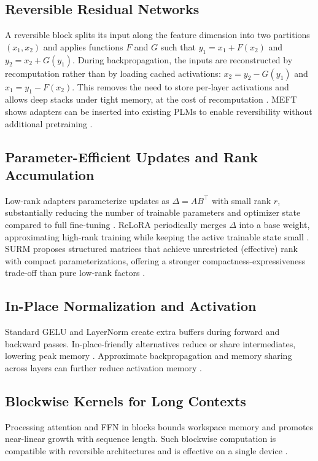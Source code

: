 \documentclass{article}
\begin{document}
\subsection{Reversible Residual Networks}
A reversible block splits its input along the feature dimension into two partitions \((x_1, x_2)\) and applies functions \(F\) and \(G\) such that \(y_1 = x_1 + F(x_2)\) and \(y_2 = x_2 + G(y_1)\). During backpropagation, the inputs are reconstructed by recomputation rather than by loading cached activations: \(x_2 = y_2 - G(y_1)\) and \(x_1 = y_1 - F(x_2)\). This removes the need to store per-layer activations and allows deep stacks under tight memory, at the cost of recomputation \cite{kitaev-2020-reformer}. MEFT shows adapters can be inserted into existing PLMs to enable reversibility without additional pretraining \cite{liao-2023-make}.

\subsection{Parameter-Efficient Updates and Rank Accumulation}
Low-rank adapters parameterize updates as \(\Delta = A B^{\top}\) with small rank \(r\), substantially reducing the number of trainable parameters and optimizer state compared to full fine-tuning \cite{he-2021-towards}. ReLoRA periodically merges \(\Delta\) into a base weight, approximating high-rank training while keeping the active trainable state small \cite{lialin-2023-relora}. SURM proposes structured matrices that achieve unrestricted (effective) rank with compact parameterizations, offering a stronger compactness-expressiveness trade-off than pure low-rank factors \cite{sehanobish-2024-structured}.

\subsection{In-Place Normalization and Activation}
Standard GELU and LayerNorm create extra buffers during forward and backward passes. In-place-friendly alternatives reduce or share intermediates, lowering peak memory \cite{andoorveedu-2022-tempo}. Approximate backpropagation and memory sharing across layers can further reduce activation memory \cite{yang-2024-reducing}.

\subsection{Blockwise Kernels for Long Contexts}
Processing attention and FFN in blocks bounds workspace memory and promotes near-linear growth with sequence length. Such blockwise computation is compatible with reversible architectures and is effective on a single device \cite{liu-2023-blockwise}.
\end{document}

